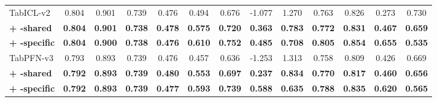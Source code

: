 \begin{table}[H]
\begin{table}[H]
\begin{tabular}{@{}l*{12}{c}@{}}
    \midrule
    TabICL-v2 & 0.804 & 0.901 & 0.739 & 0.476 & 0.494 & 0.676 & -1.077 & 1.270 & 0.763 & 0.826 & 0.273 & 0.730 \\
    \rowcolor{tabaceSharedRow}
    \textcolor{tabaceSharedText}{\textbf{+ \method{}-shared}} & \textcolor{tabaceSharedText}{\textbf{0.804}} & \textcolor{tabaceSharedText}{\textbf{0.901}} & \textcolor{tabaceSharedText}{\textbf{0.738}} & \textcolor{tabaceSharedText}{\textbf{0.478}} & \textcolor{tabaceSharedText}{\textbf{0.575}} & \textcolor{tabaceSharedText}{\textbf{0.720}} & \textcolor{tabaceSharedText}{\textbf{0.363}} & \textcolor{tabaceSharedText}{\textbf{0.783}} & \textcolor{tabaceSharedText}{\textbf{0.772}} & \textcolor{tabaceSharedText}{\textbf{0.831}} & \textcolor{tabaceSharedText}{\textbf{0.467}} & \textcolor{tabaceSharedText}{\textbf{0.659}} \\
    \rowcolor{tabaceSpecificRow}
    \textcolor{tabaceSpecificText}{\textbf{+ \method{}-specific}} & \textcolor{tabaceSpecificText}{\textbf{0.804}} & \textcolor{tabaceSpecificText}{\textbf{0.900}} & \textcolor{tabaceSpecificText}{\textbf{0.738}} & \textcolor{tabaceSpecificText}{\textbf{0.476}} & \textcolor{tabaceSpecificText}{\textbf{0.610}} & \textcolor{tabaceSpecificText}{\textbf{0.752}} & \textcolor{tabaceSpecificText}{\textbf{0.485}} & \textcolor{tabaceSpecificText}{\textbf{0.708}} & \textcolor{tabaceSpecificText}{\textbf{0.805}} & \textcolor{tabaceSpecificText}{\textbf{0.854}} & \textcolor{tabaceSpecificText}{\textbf{0.655}} & \textcolor{tabaceSpecificText}{\textbf{0.535}} \\
    \midrule
    TabPFN-v3 & 0.793 & 0.893 & 0.739 & 0.476 & 0.457 & 0.636 & -1.253 & 1.313 & 0.758 & 0.809 & 0.426 & 0.669 \\
    \rowcolor{tabaceSharedRow}
    \textcolor{tabaceSharedText}{\textbf{+ \method{}-shared}} & \textcolor{tabaceSharedText}{\textbf{0.792}} & \textcolor{tabaceSharedText}{\textbf{0.893}} & \textcolor{tabaceSharedText}{\textbf{0.739}} & \textcolor{tabaceSharedText}{\textbf{0.480}} & \textcolor{tabaceSharedText}{\textbf{0.553}} & \textcolor{tabaceSharedText}{\textbf{0.697}} & \textcolor{tabaceSharedText}{\textbf{0.237}} & \textcolor{tabaceSharedText}{\textbf{0.834}} & \textcolor{tabaceSharedText}{\textbf{0.770}} & \textcolor{tabaceSharedText}{\textbf{0.817}} & \textcolor{tabaceSharedText}{\textbf{0.460}} & \textcolor{tabaceSharedText}{\textbf{0.656}} \\
    \rowcolor{tabaceSpecificRow}
    \textcolor{tabaceSpecificText}{\textbf{+ \method{}-specific}} & \textcolor{tabaceSpecificText}{\textbf{0.792}} & \textcolor{tabaceSpecificText}{\textbf{0.893}} & \textcolor{tabaceSpecificText}{\textbf{0.739}} & \textcolor{tabaceSpecificText}{\textbf{0.477}} & \textcolor{tabaceSpecificText}{\textbf{0.593}} & \textcolor{tabaceSpecificText}{\textbf{0.739}} & \textcolor{tabaceSpecificText}{\textbf{0.588}} & \textcolor{tabaceSpecificText}{\textbf{0.635}} & \textcolor{tabaceSpecificText}{\textbf{0.788}} & \textcolor{tabaceSpecificText}{\textbf{0.835}} & \textcolor{tabaceSpecificText}{\textbf{0.620}} & \textcolor{tabaceSpecificText}{\textbf{0.565}} \\

\end{tabular}
\end{table}
\end{table}
